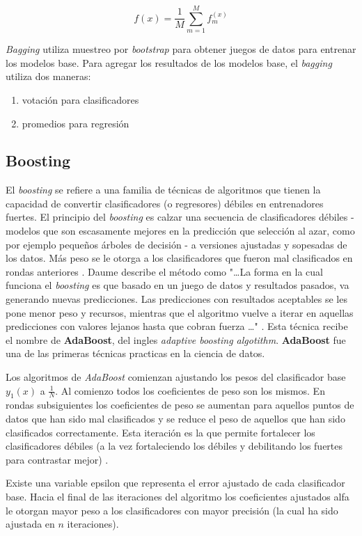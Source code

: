 \[ f(x) = \frac{1}{M} \sum_{m=1}^M f_m^{(x)} \]

\emph{Bagging} utiliza muestreo por \emph{bootstrap} para obtener juegos de datos para entrenar los modelos base. Para agregar los resultados de los modelos base, el \emph{bagging} utiliza dos maneras:
\begin{enumerate}
  \item votación para clasificadores
  \item promedios para regresión
\end{enumerate}

\subsection{Boosting}
El \emph{boosting} se refiere a una familia de técnicas de algoritmos que tienen la capacidad de convertir clasificadores (o regresores) débiles en entrenadores fuertes. El principio del \emph{boosting} es calzar una secuencia de clasificadores débiles - modelos que son escasamente mejores en la predicción que selección al azar, como por ejemplo pequeños árboles de decisión - a versiones ajustadas y sopesadas de los datos. Más peso se le otorga a los clasificadores que fueron mal clasificados en rondas anteriores \cite{smolyakov}. Daume describe el método como "\ldots La forma en la cual funciona el \emph{boosting} es que basado en un juego de datos y resultados pasados, va generando nuevas predicciones. Las predicciones con resultados aceptables se les pone menor peso y recursos, mientras que el algoritmo vuelve a iterar en aquellas predicciones con valores lejanos hasta que cobran fuerza \ldots" \cite{daume}. Esta técnica recibe el nombre de \textbf{AdaBoost}, del ingles \emph{adaptive boosting algotithm}. \textbf{AdaBoost} fue una de las primeras técnicas practicas en la ciencia de datos.

Los algoritmos de \emph{AdaBoost} comienzan ajustando los pesos del clasificador base \(y_1(x)\) a \(\frac{1}{N}\). Al comienzo todos los coeficientes de peso son los mismos. En rondas subsiguientes los coeficientes de peso se aumentan para aquellos puntos de datos que han sido mal clasificados y se reduce el peso de aquellos que han sido clasificados correctamente. Esta iteración es la que permite fortalecer los clasificadores débiles (a la vez fortaleciendo los débiles y debilitando los fuertes para contrastar mejor) \cite{smolyakov}.

Existe una variable epsilon que representa el error ajustado de cada clasificador base. Hacia el final de las iteraciones del algoritmo los coeficientes ajustados alfa le otorgan mayor peso a los clasificadores con mayor precisión (la cual ha sido ajustada en \(n\) iteraciones).

